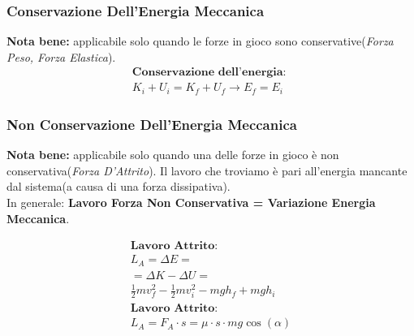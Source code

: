 \subsubsection{Conservazione Dell'Energia Meccanica}
\textbf{Nota bene: } applicabile solo quando le forze in gioco sono conservative(\textit{Forza Peso, Forza Elastica}).
\begin{gather*}
    \textbf{Conservazione dell'energia: } \\ K_i + U_i = K_f + U_f \rightarrow E_f = E_i
\end{gather*}

\subsubsection{Non Conservazione Dell'Energia Meccanica}

\textbf{Nota bene: } applicabile solo quando una delle forze in gioco è non conservativa(\textit{Forza D'Attrito}). Il lavoro che troviamo è pari all'energia mancante dal sistema(a causa di una forza dissipativa). \\
In generale: \textbf{Lavoro Forza Non Conservativa = Variazione Energia Meccanica}.

\begin{gather*}
    \textbf{Lavoro Attrito: } \\ L_A = \Delta E = \\ = \Delta K - \Delta U = \\ \frac{1}{2} m v_f^2 - \frac{1}{2} m v_i^2 - mgh_f + mgh_i \\
    \textbf{Lavoro Attrito: } \\ L_A = F_{A} \cdot s = \mu \cdot s \cdot m g \cos (\alpha)
\end{gather*}